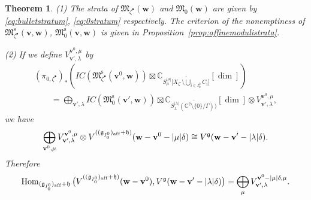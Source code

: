 \documentclass[pdftex]{sigma}
\newtheorem{Theorem}[equation]{Theorem}
\theoremstyle{definition}
\numberwithin{equation}{section}
\newcommand{\C}{{\mathbb C}}
\newcommand{\g}{{\mathfrak g}}
\newcommand{\Hom}{\operatorname{Hom}}
\newcommand{\M}{{\mathfrak M}} %
\newcommand{\Mreg}{\M^{\operatorname{s}}}
\newcommand{\bv}{{\mathbf v}} %
\newcommand{\bw}{{\mathbf w}} %
\newcommand{\aff}{\mathrm{af\/f}}
\newcommand{\affLevi}{(\g_{I_0^0})_{\aff}}
\begin{document}
\begin{Theorem}\label{thm:branch'}
\textup{(1)} The strata of $\M_{\zeta^\bullet}(\bw)$ and $\M_0(\bw)$
are given by \eqref{eq:bulletstratum}, \eqref{eq:0stratum} respectively.
The criterion of the nonemptiness of $\Mreg_{\zeta^\bullet}(\bv,\bw)$,
$\Mreg_0(\bv,\bw)$ is given in Proposition~{\rm \ref{prop:affinemodulistrata}}.

\textup{(2)} If we define $V^{\bv^0,\mu}_{\bv',\lambda}$ by
\begin{gather*}
  (\pi_{0,\zeta^\bullet})_*\left(IC(\Mreg_{\zeta^\bullet}(\bv^0,\bw))
  \boxtimes \C_{\overline{S^{|\mu|}_\mu
  \big[X_{\zeta^\circ}\setminus \bigcup_{i\in I_0^0} C_i \big]}}[\dim]
  \right)
\\
\qquad{} =
   \bigoplus_{\bv',\lambda}
   IC(\Mreg_0(\bv',\bw)) \boxtimes
   \C_{\overline{S^{|\lambda|}_\lambda(\C^2\setminus\{0\}/\Gamma))}}[\dim]
   \otimes V^{\bv^0,\mu}_{\bv',\lambda},
\end{gather*}
we have
\begin{equation*}
  \bigoplus_{\bv^0,\mu} V^{\bv^0,\mu}_{\bv',\lambda}
  \otimes V^{(\affLevi+\mathfrak h)}(\bw - \bv^0-|\mu|\delta)
  \cong V^\g(\bw - \bv' - |\lambda|\delta).
\end{equation*}
Therefore
\begin{equation}\label{eq:mu}
  \Hom_{\affLevi+\mathfrak h}
  \big(V^{(\affLevi+\mathfrak h)}(\bw - \bv^0),
  V^\g(\bw-\bv'-|\lambda|\delta)\big)
  = \bigoplus_\mu V^{\bv^0-|\mu|\delta,\mu}_{\bv',\lambda}.
\end{equation}
\end{Theorem}
\end{document}
